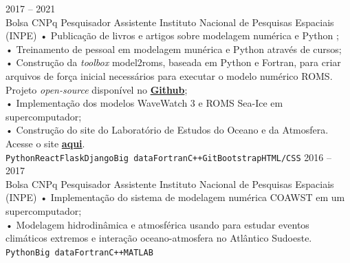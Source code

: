 \documentclass[9pt]{developercv} %
\begin{document}
\begin{entrylist}
	\entry
		{2017 -- 2021\\\footnotesize{Bolsa CNPq}}
		{Pesquisador Assistente}
		{Instituto Nacional de Pesquisas Espaciais (INPE)}
		{• Publicação de livros e artigos sobre modelagem numérica e Python ; \\
		• Treinamento de pessoal em modelagem munérica e Python através de cursos; \\
		• Construção da \textit{toolbox} model2roms, baseada em Python e Fortran,  para criar arquivos de força inicial necessários para executar o modelo numérico ROMS.  Projeto \textit{open-source} disponível no \href{https://github.com/uesleisutil/model2roms}{\textcolor{bleu_cite}{\textbf{Github}}}; \\	
		• Implementação dos modelos WaveWatch 3 e ROMS Sea-Ice em supercomputador;\\
		• Construção do site do Laboratório de Estudos do Oceano e da Atmosfera. Acesse o site \href{https://loa-inpe.github.io/}{\textcolor{bleu_cite}{\textbf{aqui}}}. \\
		\texttt{Python}\slashsep\texttt{React}\slashsep\texttt{Flask}\slashsep\texttt{Django}\slashsep\texttt{Big data}\slashsep\texttt{Fortran}\slashsep\texttt{C++}\slashsep\texttt{Git}\slashsep\texttt{Bootstrap}\slashsep\texttt{HTML/CSS}}
	\entry
		{2016 -- 2017\\\footnotesize{Bolsa CNPq}}
		{Pesquisador Assistente}
		{Instituto Nacional de Pesquisas Espaciais (INPE)}
		{•  Implementação do sistema de modelagem numérica COAWST em um supercomputador; \\
		 • Modelagem hidrodinâmica e atmosférica usando para estudar eventos climáticos extremos e interação oceano-atmosfera no Atlântico Sudoeste. 
		 \\ \texttt{Python}\slashsep\texttt{Big data}\slashsep\texttt{Fortran}\slashsep\texttt{C++}\slashsep\texttt{MATLAB}}
\end{entrylist}

\vspace{-0.5cm}
\end{document}
